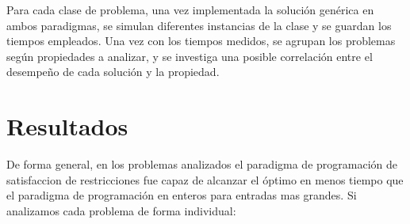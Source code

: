 \documentclass[12pt]{report}
\begin{document}
Para cada clase de problema, una vez implementada la solución genérica en ambos paradigmas, se simulan diferentes instancias de la clase y se guardan los tiempos empleados. Una vez con los tiempos medidos, se agrupan los problemas según propiedades a analizar, y se investiga una posible correlación entre el desempeño de cada solución y la propiedad.

\chapter{Resultados}

De forma general, en los problemas analizados el paradigma de programación de satisfaccion de restricciones fue capaz de alcanzar el óptimo en menos tiempo que el paradigma de programación en enteros para entradas mas grandes. Si analizamos cada problema de forma individual:
\end{document}

